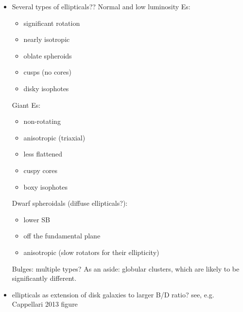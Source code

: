 \documentclass{article}
\begin{document}
\begin{itemize}
\begin{itemize}
        \end{itemize}
    \item Several types of ellipticals??
        Normal and low luminosity Es:
        \begin{itemize}
            \item significant rotation
            \item nearly isotropic
            \item oblate spheroids
            \item cusps (no cores)
            \item disky isophotes
        \end{itemize}
        Giant Es:
        \begin{itemize}
            \item non-rotating
            \item anisotropic (triaxial)
            \item less flattened
            \item cuspy cores
            \item boxy isophotes
        \end{itemize}
        Dwarf spheroidals (diffuse ellipticals?):
        \begin{itemize}
            \item lower SB
            \item off the fundamental plane
            \item anisotropic (slow rotators for their ellipticity)
        \end{itemize}
        Bulges: multiple types? As an aside: globular clusters, which are
        likely to be significantly different.
    \item ellipticals as extension of disk galaxies to larger B/D ratio?
        see, e.g. Cappellari 2013 figure
\end{itemize}
\end{document}
